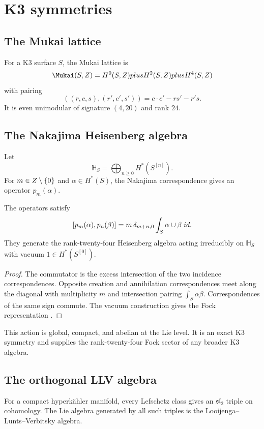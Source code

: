 \part{K3 symmetries}

\chapter{The Mukai lattice}
For a K3 surface $S$, the Mukai lattice is
\[
 \Mukai(S,\Z)=H^0(S,\Z)\oplus H^2(S,\Z)\oplus H^4(S,\Z)
\]
with pairing
\[
 ((r,c,s),(r',c',s'))=c\cdot c'-rs'-r's.
\]
It is even unimodular of signature $(4,20)$ and rank $24$.

\chapter{The Nakajima Heisenberg algebra}
Let
\[
 \mathbb H_S=\bigoplus_{n\ge0}H^*(S^{[n]}).
\]
For $m\in Z\setminus\{0\}$ and $\alpha\in H^*(S)$, the Nakajima correspondence gives an operator $p_m(\alpha)$.

\begin{theorem}
The operators satisfy
\[
 [p_m(\alpha),p_n(\beta)]
 =m\,\delta_{m+n,0}\int_S\alpha\cup\beta\;id.
\]
They generate the rank-twenty-four Heisenberg algebra acting irreducibly on $\mathbb H_S$ with vacuum $1\in H^*(S^{[0]})$.
\end{theorem}
\begin{proof}
The commutator is the excess intersection of the two incidence correspondences. Opposite creation and annihilation correspondences meet along the diagonal with multiplicity $m$ and intersection pairing $\int_S\alpha\beta$. Correspondences of the same sign commute. The vacuum construction gives the Fock representation \cite{Nakajima97}.
\end{proof}

This action is global, compact, and abelian at the Lie level. It is an exact K3 symmetry and supplies the rank-twenty-four Fock sector of any broader K3 algebra.

\chapter{The orthogonal LLV algebra}
For a compact hyperkähler manifold, every Lefschetz class gives an $\mathfrak{sl}_2$ triple on cohomology. The Lie algebra generated by all such triples is the Looijenga--Lunts--Verbitsky algebra.

